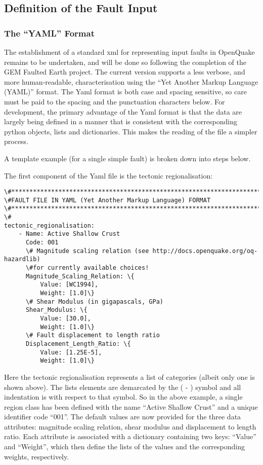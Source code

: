 \subsection{Definition of the Fault Input}

\subsubsection{The ``YAML'' Format}

The establishment of a standard xml for representing input faults in OpenQuake remains to be undertaken, and will be done so following the completion of the GEM Faulted Earth project. The current version supports a less verbose, and more human-readable, characterisation using the ``Yet Another Markup Language (YAML)'' format. The Yaml format is both case and spacing sensitive, so care must be paid to the spacing and the punctuation characters below. For development, the primary advantage of the Yaml format
is that the data are largely being defined in a manner that is consistent with the 
corresponding python objects, lists and dictionaries. This makes the reading of the file a simpler process. 

A template example (for a single simple fault) is broken down into steps below.

The first component of the Yaml file is the tectonic regionalisation:

\begin{Verbatim}[frame=single, commandchars=\\\{\}, fontsize=\scriptsize]
\#*****************************************************************************
\#FAULT FILE IN YAML (Yet Another Markup Language) FORMAT
\#*****************************************************************************
\#
tectonic_regionalisation:
    - Name: Active Shallow Crust
      Code: 001
      \# Magnitude scaling relation (see http://docs.openquake.org/oq-hazardlib)
      \#for currently available choices!
      Magnitude_Scaling_Relation: \{
          Value: [WC1994],
          Weight: [1.0]\}
      \# Shear Modulus (in gigapascals, GPa)
      Shear_Modulus: \{
          Value: [30.0],
          Weight: [1.0]\}
      \# Fault displacement to length ratio
      Displacement_Length_Ratio: \{
          Value: [1.25E-5],
          Weight: [1.0]\}
\end{Verbatim}

Here the tectonic regionalisation represents a list of categories (albeit only one is shown above). The lists elements are demarcated by the ( - ) symbol and all indentation is with respect to that symbol. So in the above example, a single region class has been defined with the name ``Active Shallow Crust'' and a unique identifier code ``001''. The default values are now provided for the three data attributes: magnitude scaling relation, shear modulus and displacement to length ratio. Each attribute is associated with a dictionary containing two keys: ``Value'' and ``Weight'', which then define the lists of the values and the corresponding weights, respectively.

